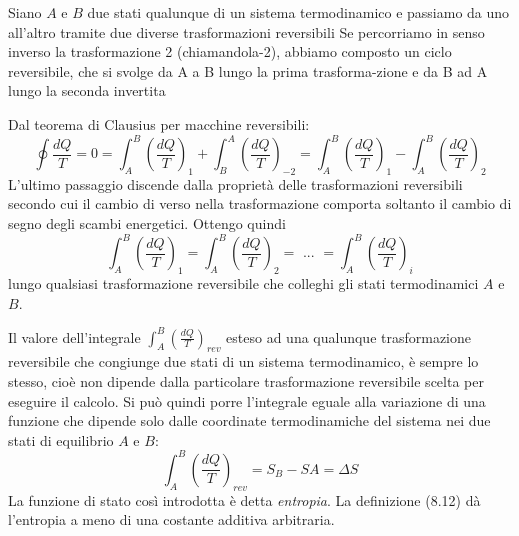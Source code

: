 \documentclass[class=book, crop=false, oneside, 12pt]{standalone}
\begin{document}
Siano \(A\) e \(B\) due stati qualunque di un sistema termodinamico e passiamo da uno all'altro tramite due diverse trasformazioni reversibili
Se percorriamo in senso inverso la trasformazione 2 (chiamandola-2), abbiamo composto un ciclo reversibile, che si svolge da A a B lungo la prima trasforma-zione e da B ad A lungo la seconda invertita

Dal teorema di Clausius per macchine reversibili:
\begin{equation*}
    \oint \frac{d Q}{T} = 0 = \int_A^B \left(\frac{d Q}{T}\right)_1 + \int_B^A \left(\frac{d Q}{T}\right)_{-2} = \int_A^B \left(\frac{d Q}{T}\right)_1 - \int_A^B \left(\frac{d Q}{T}\right)_{2} 
\end{equation*}
L'ultimo passaggio discende dalla proprietà delle trasformazioni reversibili secondo cui il cambio di verso nella trasformazione comporta soltanto il cambio di segno degli scambi energetici. 
Ottengo quindi
\begin{equation*}
    \int_A^B \left(\frac{d Q}{T}\right)_1 = \int_A^B \left(\frac{d Q}{T}\right)_2 = \text{ ... } = \int_A^B \left(\frac{d Q}{T}\right)_i
\end{equation*}
lungo qualsiasi trasformazione reversibile che colleghi gli stati termodinamici \(A\) e \(B\). 

Il valore dell'integrale \(\int_A^B \left(\frac{d Q}{T}\right)_{rev}\) esteso ad una qualunque trasformazione reversibile che congiunge due stati di un sistema termodinamico, è sempre lo stesso, cioè non dipende dalla particolare trasformazione reversibile scelta per eseguire il calcolo. \newline
Si può quindi porre l'integrale eguale alla variazione di una funzione che dipende solo dalle coordinate termodinamiche del sistema nei due stati di equilibrio \(A\) e \(B\):
\begin{equation}
    \int_A^B \left(\frac{d Q}{T}\right)_{rev} = S_{B} - S{A} = \Delta S
\end{equation}
La funzione di stato così introdotta è detta \emph{entropia}.\newline
La definizione (8.12) dà l'entropia a meno di una costante additiva arbitraria.
\end{document}
